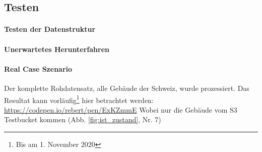 \subsection{Testen}

\paragraph{Testen der Datenstruktur}


\paragraph{Unerwartetes Herunterfahren}


\paragraph{Real Case Szenario}

Der komplette Rohdatensatz, alle Gebäude der Schweiz, wurde prozessiert. Das Resultat kann vorläufig\footnote{Bis am 1. November 2020} hier betrachtet werden:
\href{https://codepen.io/rebert/pen/ExKZmmE}{https://codepen.io/rebert/pen/ExKZmmE} Wobei nur die Gebäude vom S3 Testbucket kommen (Abb. \ref{fig:ist_zustand}, Nr. 7) 
